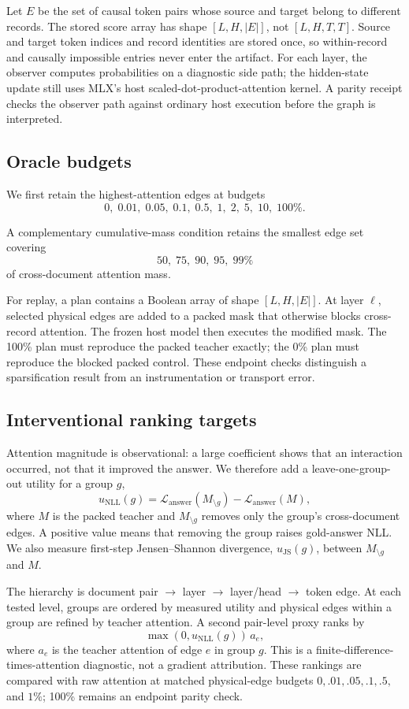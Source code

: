 \documentclass[11pt]{article}
\begin{document}
Let $E$ be the set of causal token pairs whose source and target belong to
different records. The stored score array has shape $[L,H,|E|]$, not
$[L,H,T,T]$. Source and target token indices and record identities are stored
once, so within-record and causally impossible entries never enter the artifact.
For each layer, the observer computes probabilities on a diagnostic side path;
the hidden-state update still uses MLX's host scaled-dot-product-attention
kernel. A parity receipt checks the observer path against ordinary host
execution before the graph is interpreted.

\subsection{Oracle budgets}

We first retain the highest-attention edges at budgets
\[
0,\;0.01,\;0.05,\;0.1,\;0.5,\;1,\;2,\;5,\;10,\;100\%.
\]

A complementary cumulative-mass condition retains the smallest edge set
covering
\[
50,\;75,\;90,\;95,\;99\%
\]
of cross-document attention mass.

For replay, a plan contains a Boolean array of shape $[L,H,|E|]$. At layer
$\ell$, selected physical edges are added to a packed mask that otherwise
blocks cross-record attention. The frozen host model then executes the modified
mask. The 100\% plan must reproduce the packed teacher exactly; the 0\% plan
must reproduce the blocked packed control. These endpoint checks distinguish a
sparsification result from an instrumentation or transport error.

\subsection{Interventional ranking targets}

Attention magnitude is observational: a large coefficient shows that an
interaction occurred, not that it improved the answer. We therefore add a
leave-one-group-out utility for a group $g$,
\[
u_{\mathrm{NLL}}(g)
=
\mathcal L_{\mathrm{answer}}(M_{\setminus g})
-
\mathcal L_{\mathrm{answer}}(M),
\]
where $M$ is the packed teacher and $M_{\setminus g}$ removes only the group's
cross-document edges. A positive value means that removing the group raises
gold-answer NLL. We also measure first-step Jensen--Shannon divergence,
$u_{\mathrm{JS}}(g)$, between $M_{\setminus g}$ and $M$.

The hierarchy is document pair $\rightarrow$ layer $\rightarrow$ layer/head
$\rightarrow$ token edge. At each tested level, groups are ordered by measured
utility and physical edges within a group are refined by teacher attention. A
second pair-level proxy ranks by
\[
\max(0,u_{\mathrm{NLL}}(g))\,a_e,
\]
where $a_e$ is the teacher attention of edge $e$ in group $g$. This is a
finite-difference-times-attention diagnostic, not a gradient attribution.
These rankings are compared with raw attention at matched physical-edge
budgets $0,.01,.05,.1,.5,$ and $1\%$; 100\% remains an endpoint parity check.
\end{document}
